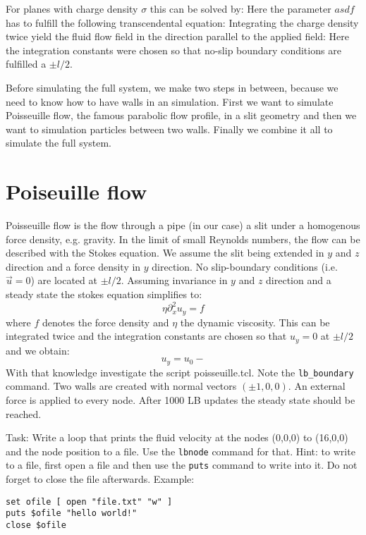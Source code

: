 For planes with charge density $\sigma$ this can be solved by:
Here the parameter $asdf$ has to fulfill the following transcendental
equation:
Integrating the charge density twice yield the fluid flow field
in the direction parallel to the applied field:
Here the integration constants were chosen so that no-slip boundary
conditions are fulfilled a $\pm l/2$.

Before simulating the full system, we make two steps in between, because
we need to know how to have walls in an \ES{} simulation. First we want
to simulate Poisseuille flow, the famous parabolic flow profile, in a slit
geometry and then we want to simulation particles between two walls. Finally
we combine it all to simulate the full system.
\section{Poiseuille flow \ES{}}
Poisseuille flow is the flow through a pipe (in our case) a slit
under a homogenous force density, e.g. gravity. In the limit of small Reynolds
numbers, the flow can be described with the Stokes equation. 
We assume the slit being extended in $y$ and $z$ direction and a force
density in $y$ direction. No slip-boundary conditions  (i.e. $\vec{u}=0$)
are located at $\pm l/2$.
Assuming invariance in $y$ and $z$ direction and a steady state 
the stokes equation simplifies to:
\begin{equation}
  \eta \partial_x^2 u_y = f
\end{equation}
where $f$ denotes the force density and $\eta$ the dynamic viscosity.
This can be integrated twice and the integration constants are chosen
so that $u_y=0$ at $\pm l/2$ and we obtain:
\begin{equation}
  u_y = u_0 - 
\end{equation}
With that knowledge investigate the script poisseuille.tcl.
Note the \lstinline{lb_boundary} command. Two walls are created
with normal vectors $\left(\pm 1, 0, 0 \right)$. An external force
is applied to every node. After 1000 LB updates the steady state should
be reached.

Task: Write a loop that prints the fluid velocity at the nodes (0,0,0) to (16,0,0)
and the node position to a file. Use the \lstinline|lbnode| command for that. Hint: to write 
to a file, first open a file and then use the \lstinline|puts| command to write 
into it. Do not forget to close the file afterwards. Example:
\vspace{ 0,2cm}
\begin{lstlisting}[numbers=none]
set ofile [ open "file.txt" "w" ]
puts $ofile "hello world!"
close $ofile
\end{lstlisting}
\vspace{ 0,2cm}

